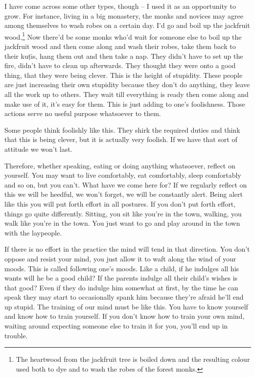 I have come across some other types, though -- I used it as an opportunity to grow.  For instance, living in a big monastery, the monks and novices may agree among themselves to wash robes on a certain day. I'd go and boil up the jackfruit wood.\footnote{The heartwood from the jackfruit tree is boiled down and the resulting colour used both to dye and to wash the robes of the forest monks.} Now there'd be some monks who'd wait for someone else to boil up the jackfruit wood and then come along and wash their robes, take them back to their ku\d{t}\={\i}s, hang them out and then take a nap. They didn't have to set up the fire, didn't have to clean up afterwards. They thought they were onto a good thing, that they were being clever. This is the height of stupidity. These people are just increasing their own stupidity because they don't do anything, they leave all the work up to others. They wait till everything is ready then come along and make use of it, it's easy for them. This is just adding to one's foolishness. Those actions serve no useful purpose whatsoever to them.

Some people think foolishly like this. They shirk the required duties and think that this is being clever, but it is actually very foolish. If we have that sort of attitude we won't last.

Therefore, whether speaking, eating or doing anything whatsoever, reflect on yourself. You may want to live comfortably, eat comfortably, sleep comfortably and so on, but you can't. What have we come here for? If we regularly reflect on this we will be heedful, we won't forget, we will be constantly alert. Being alert like this you will put forth effort in all postures. If you don't put forth effort, things go quite differently. Sitting, you sit like you're in the town, walking, you walk like you're in the town. You just want to go and play around in the town with the laypeople.

If there is no effort in the practice the mind will tend in that direction. You don't oppose and resist your mind, you just allow it to waft along the wind of your moods. This is called following one's moods. Like a child, if he indulges all his wants will he be a good child? If the parents indulge all their child's wishes is that good? Even if they do indulge him somewhat at first, by the time he can speak they may start to occasionally spank him because they're afraid he'll end up stupid. The training of our mind must be like this. You have to know yourself and know how to train yourself. If you don't know how to train your own mind, waiting around expecting someone else to train it for you, you'll end up in trouble.

